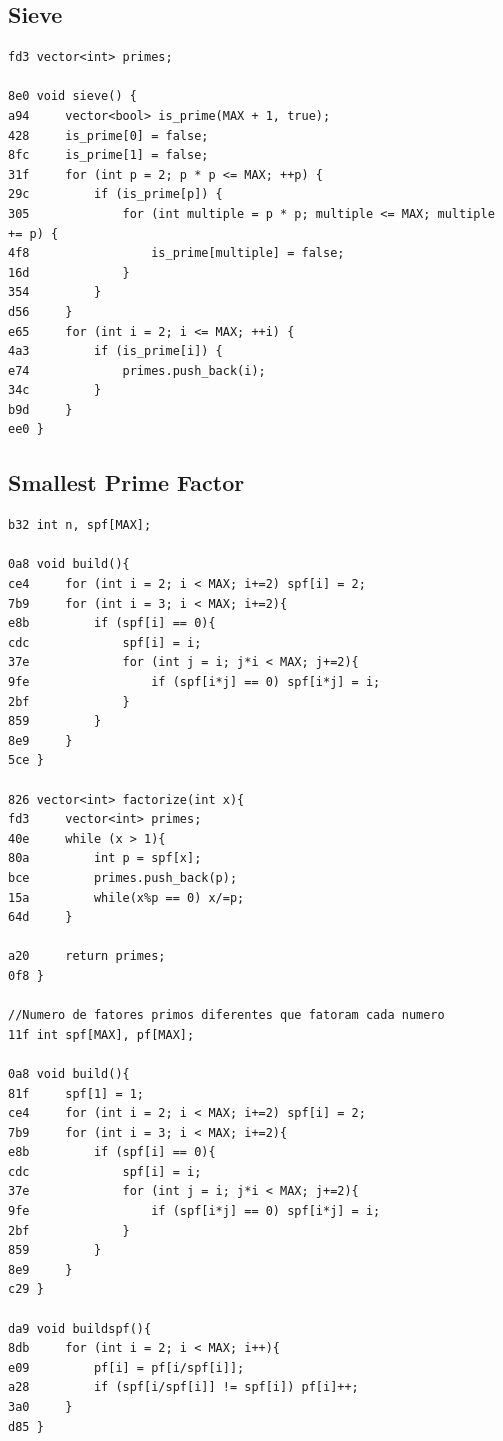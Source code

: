 \documentclass[11pt, a4paper, twoside]{article}
\begin{document}
{\subsection{Sieve}
\begin{lstlisting}
fd3 vector<int> primes;

8e0 void sieve() {
a94     vector<bool> is_prime(MAX + 1, true);
428     is_prime[0] = false;
8fc     is_prime[1] = false;
31f     for (int p = 2; p * p <= MAX; ++p) {
29c         if (is_prime[p]) {
305             for (int multiple = p * p; multiple <= MAX; multiple += p) {
4f8                 is_prime[multiple] = false;
16d             }
354         }
d56     }
e65     for (int i = 2; i <= MAX; ++i) {
4a3         if (is_prime[i]) {
e74             primes.push_back(i);
34c         }
b9d     }
ee0 }
\end{lstlisting}

\subsection{Smallest Prime Factor}
\begin{lstlisting}
b32 int n, spf[MAX];

0a8 void build(){
ce4     for (int i = 2; i < MAX; i+=2) spf[i] = 2;
7b9     for (int i = 3; i < MAX; i+=2){
e8b         if (spf[i] == 0){
cdc             spf[i] = i;
37e             for (int j = i; j*i < MAX; j+=2){
9fe                 if (spf[i*j] == 0) spf[i*j] = i;
2bf             }
859         }
8e9     }
5ce }

826 vector<int> factorize(int x){
fd3     vector<int> primes;
40e     while (x > 1){
80a         int p = spf[x];
bce         primes.push_back(p);
15a         while(x%p == 0) x/=p;
64d     }
        
a20     return primes;
0f8 }

//Numero de fatores primos diferentes que fatoram cada numero
11f int spf[MAX], pf[MAX];

0a8 void build(){
81f     spf[1] = 1;
ce4     for (int i = 2; i < MAX; i+=2) spf[i] = 2;
7b9     for (int i = 3; i < MAX; i+=2){
e8b         if (spf[i] == 0){
cdc             spf[i] = i;
37e             for (int j = i; j*i < MAX; j+=2){
9fe                 if (spf[i*j] == 0) spf[i*j] = i;
2bf             }
859         }
8e9     }
c29 }

da9 void buildspf(){
8db     for (int i = 2; i < MAX; i++){
e09         pf[i] = pf[i/spf[i]];
a28         if (spf[i/spf[i]] != spf[i]) pf[i]++;
3a0     } 
d85 }
\end{lstlisting}



}
\end{document}
